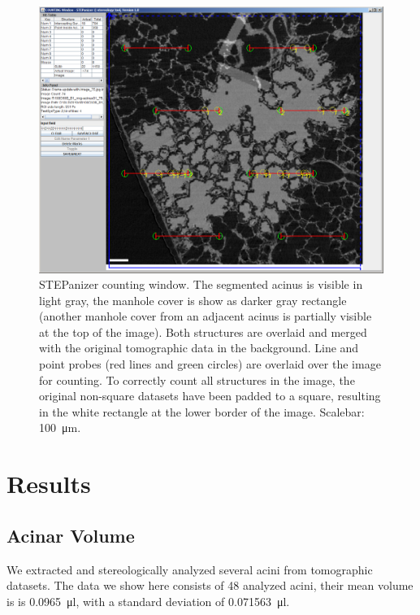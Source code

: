 \documentclass[%
	twoside,
	paper=a4,%
	abstract=true,%
	]{scrartcl}
\newcommand{\imsize}{\linewidth}
\newcommand{\numberofacini}{48}
\newcommand{\volume}{0.0965}
\begin{document}
\renewcommand{\imsize}{\linewidth}%
\begin{figure}
	\centering
	\includegraphics[width=\imsize]{img/STEPanizer_2010_R108C60B_acinus01_Slice75}
	\caption{STEPanizer counting window. The segmented acinus is visible in light gray, the manhole cover is show as darker gray rectangle (another manhole cover from an adjacent acinus is partially visible at the top of the image). Both structures are overlaid and merged with the original tomographic data in the background. Line and point probes (red lines and green circles) are overlaid over the image for counting. To correctly count all structures in the image, the original non-square datasets have been padded to a square, resulting in the white rectangle at the lower border of the image. Scalebar: \SI{100}{\micro\meter}.}
	\label{fig:STEPanizer}
\end{figure}

\section{Results}
\subsection{Acinar Volume}
We extracted and stereologically analyzed several acini from tomographic datasets. The data we show here consists of \numberofacini\xspace analyzed acini, their mean volume is is \SI{\volume}{\micro\litre}, with a standard deviation of \SI{0.071563}{\micro\litre}.
\end{document}
